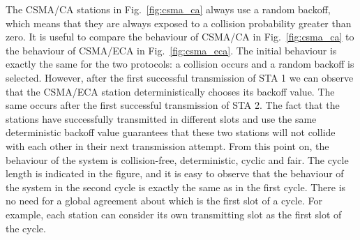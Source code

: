 \documentclass[journal]{IEEEtran}
\begin{document}
The CSMA/CA stations in Fig.~\ref{fig:csma_ca} always use a random backoff, which means that they are always exposed to a collision probability greater than zero.
It is useful to compare the behaviour of CSMA/CA in Fig.~\ref{fig:csma_ca} to the behaviour of CSMA/ECA in Fig.~\ref{fig:csma_eca}.
The initial behaviour is exactly the same for the two protocols: a collision occurs and a random backoff is selected.
However, after the first successful transmission of STA 1 we can observe that the CSMA/ECA station deterministically chooses its backoff value.
The same occurs after the first successful transmission of STA 2.
The fact that the stations have successfully transmitted in different slots and use the same deterministic backoff value guarantees that these two stations will not collide with each other in their next transmission attempt.
From this point on, the behaviour of the system is collision-free, deterministic, cyclic and fair.
The cycle length is indicated in the figure, and it is easy to observe that the behaviour of the system in the second cycle is exactly the same as in the first cycle.
There is no need for a global agreement about which is the first slot of a cycle.
For example, each station can consider its own transmitting slot as the first slot of the cycle.
\end{document}
